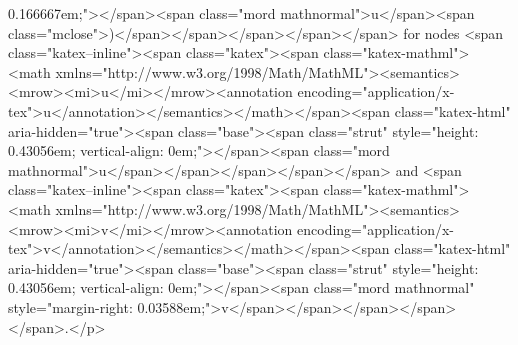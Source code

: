 0.166667em;"></span><span class="mord mathnormal">u</span><span class="mclose">)</span></span></span></span></span> for nodes <span class="katex--inline"><span class="katex"><span class="katex-mathml"><math xmlns="http://www.w3.org/1998/Math/MathML"><semantics><mrow><mi>u</mi></mrow><annotation encoding="application/x-tex">u</annotation></semantics></math></span><span class="katex-html" aria-hidden="true"><span class="base"><span class="strut" style="height: 0.43056em; vertical-align: 0em;"></span><span class="mord mathnormal">u</span></span></span></span></span> and <span class="katex--inline"><span class="katex"><span class="katex-mathml"><math xmlns="http://www.w3.org/1998/Math/MathML"><semantics><mrow><mi>v</mi></mrow><annotation encoding="application/x-tex">v</annotation></semantics></math></span><span class="katex-html" aria-hidden="true"><span class="base"><span class="strut" style="height: 0.43056em; vertical-align: 0em;"></span><span class="mord mathnormal" style="margin-right: 0.03588em;">v</span></span></span></span></span>.</p>
